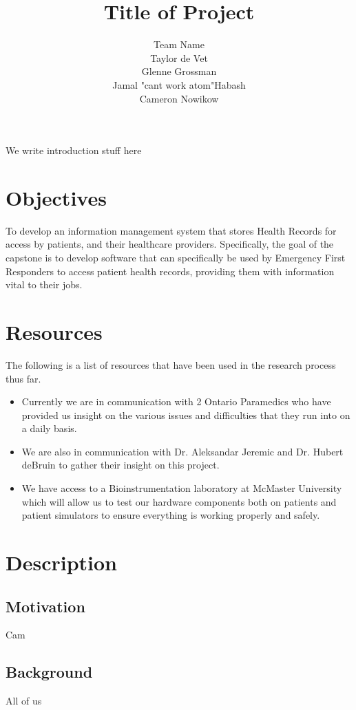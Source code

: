\documentclass{article}
\title{Title of Project}
\author{Team Name
		\\ Taylor de Vet
    \\ Glenne Grossman
		\\ Jamal "cant work atom"Habash
		\\ Cameron Nowikow
}
\date{}
\begin{document}
\newpage

\maketitle

We write introduction stuff here

\section{Objectives}

To develop an information management system that stores Health Records for access by patients, and their healthcare providers. Specifically, the goal of the capstone is to develop software that can specifically be used by Emergency First Responders to access patient health records,
providing them with information vital to their jobs.

\section{Resources}
The following is a list of resources that have been used in the research process thus far.
\begin{itemize}
\item Currently we are in communication with 2 Ontario Paramedics who have provided us insight on the various issues and difficulties that they run into on a daily basis.
\item We are also in communication with Dr. Aleksandar Jeremic and Dr. Hubert deBruin to gather their insight on this project. 
\item We have access to a Bioinstrumentation laboratory at McMaster University which will allow us to test our hardware components both on patients and patient simulators to ensure everything is working properly and safely. 
\end{itemize}



\section{Description}

\subsection{Motivation}
Cam
\subsection{Background}
All of us
\end{document}
